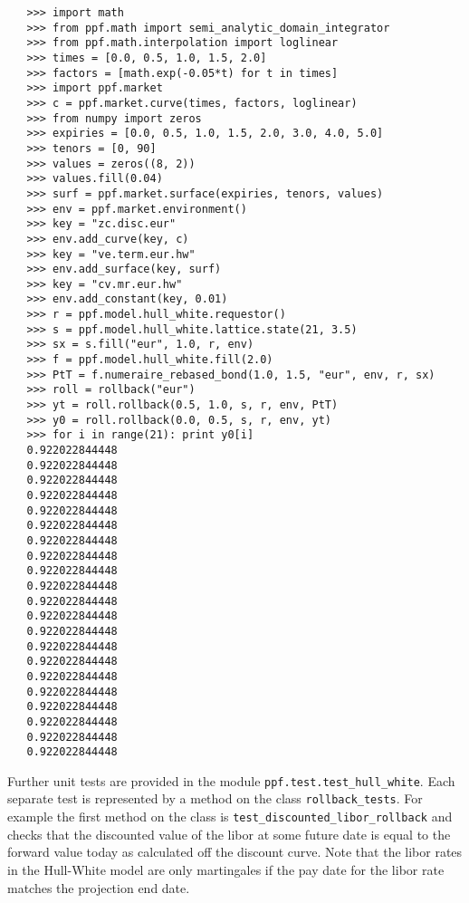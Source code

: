 \begin{verbatim}
   >>> import math
   >>> from ppf.math import semi_analytic_domain_integrator
   >>> from ppf.math.interpolation import loglinear
   >>> times = [0.0, 0.5, 1.0, 1.5, 2.0]
   >>> factors = [math.exp(-0.05*t) for t in times]
   >>> import ppf.market
   >>> c = ppf.market.curve(times, factors, loglinear)
   >>> from numpy import zeros
   >>> expiries = [0.0, 0.5, 1.0, 1.5, 2.0, 3.0, 4.0, 5.0]
   >>> tenors = [0, 90]
   >>> values = zeros((8, 2))
   >>> values.fill(0.04)
   >>> surf = ppf.market.surface(expiries, tenors, values)
   >>> env = ppf.market.environment()
   >>> key = "zc.disc.eur"
   >>> env.add_curve(key, c)
   >>> key = "ve.term.eur.hw"
   >>> env.add_surface(key, surf)
   >>> key = "cv.mr.eur.hw"
   >>> env.add_constant(key, 0.01)
   >>> r = ppf.model.hull_white.requestor()
   >>> s = ppf.model.hull_white.lattice.state(21, 3.5)
   >>> sx = s.fill("eur", 1.0, r, env)
   >>> f = ppf.model.hull_white.fill(2.0)
   >>> PtT = f.numeraire_rebased_bond(1.0, 1.5, "eur", env, r, sx)
   >>> roll = rollback("eur")
   >>> yt = roll.rollback(0.5, 1.0, s, r, env, PtT)
   >>> y0 = roll.rollback(0.0, 0.5, s, r, env, yt)
   >>> for i in range(21): print y0[i]
   0.922022844448
   0.922022844448
   0.922022844448
   0.922022844448
   0.922022844448
   0.922022844448
   0.922022844448
   0.922022844448
   0.922022844448
   0.922022844448
   0.922022844448
   0.922022844448
   0.922022844448
   0.922022844448
   0.922022844448
   0.922022844448
   0.922022844448
   0.922022844448
   0.922022844448
   0.922022844448
   0.922022844448
\end{verbatim}
Further unit tests are provided in the module \verb|ppf.test.test_hull_white|. Each separate test is represented by a method on the 
class \verb|rollback_tests|. For example the first method on the class is \verb|test_discounted_libor_rollback| and checks that the discounted 
value of the libor at some future date is equal to the forward value today as calculated off the discount curve. Note that the libor rates in the Hull-White 
model are only martingales if the pay date for the libor rate matches the projection end date.
